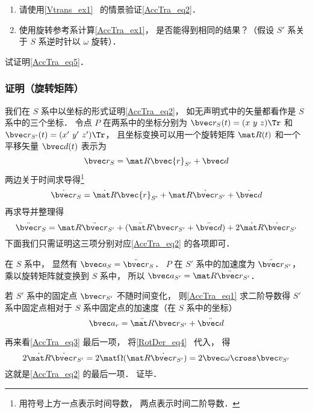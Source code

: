 \begin{exercise}{}\label{AccTra_exe1}
\begin{enumerate}
\item 请使用\autoref{Vtrans_ex1}~ 的情景验证\autoref{AccTra_eq2}．
\item 使用旋转参考系计算\autoref{AccTra_ex1}， 是否能得到相同的结果？（假设 $S'$ 系关于 $S$ 系逆时针以 $\omega$ 旋转）．
\end{enumerate}
\end{exercise}

\begin{exercise}{}
试证明\autoref{AccTra_eq5}．
\end{exercise}

\subsubsection{证明（旋转矩阵）}
我们在 $S$ 系中以坐标的形式证明\autoref{AccTra_eq2}， 如无声明式中的矢量都看作是 $S$ 系中的三个坐标． 令点 $P$ 在两系中的坐标分别为 $\bvec r_S(t) = (x\ y\ z)\Tr$ 和 $\bvec r_{S'}(t) = (x'\ y'\ z')\Tr$， 且坐标变换可以用一个旋转矩阵 $\mat R(t)$ 和一个平移矢量 $\bvec d(t)$ 表示为
\begin{equation}
\bvec r_S = \mat R \bvec{r}_{S'} + \bvec d
\end{equation}
两边关于时间求导得\footnote{用符号上方一点表示时间导数， 两点表示时间二阶导数．}
\begin{equation}
\dot{\bvec r}_S = \dot{\mat R} \bvec{r}_{S'} + \mat R \dot{\bvec r}_{S'}+ \dot{\bvec d}
\end{equation}
再求导并整理得
\begin{equation}\label{AccTra_eq3}
\ddot{\bvec r}_S = \mat R \ddot{\bvec r}_{S'} + (\ddot{\mat R} \bvec r_{S'} + \ddot{\bvec d}) + 2 \dot{\mat R} \dot{\bvec r}_{S'}
\end{equation}
下面我们只需证明这三项分别对应\autoref{AccTra_eq2} 的各项即可．

在 $S$ 系中， 显然有 $\bvec a_S = \ddot{\bvec r}_S$． $P$ 在 $S'$ 系中的加速度为 $\ddot{\bvec r}_{S'}$， 乘以旋转矩阵就变换到 $S$ 系中， 所以 $\bvec a_{S'} = \mat R \ddot{\bvec r}_{S'}$．

若 $S'$ 系中的固定点 $\bvec r_{S'}$ 不随时间变化， 则\autoref{AccTra_eq1} 求二阶导数得 $S'$ 系中固定点相对于 $S$ 系中固定点的加速度（在 $S$ 系中的坐标）
\begin{equation}
\bvec a_r = \ddot{\mat R} \bvec r_{S'} + \ddot{\bvec d}
\end{equation}

再来看\autoref{AccTra_eq3} 最后一项， 将\autoref{RotDer_eq4}~ 代入， 得
\begin{equation}
2\dot{\mat R} \dot{\bvec r}_{S'} = 2\mat\Omega (\mat R \dot{\bvec r}_{S'}) = 2\bvec \omega \cross \bvec v_{S'}
\end{equation}
这就是\autoref{AccTra_eq2} 的最后一项． 证毕．

